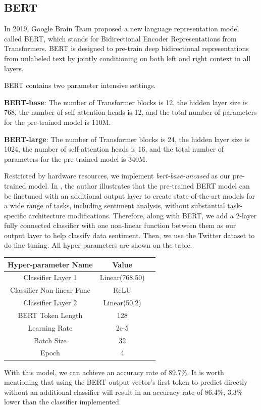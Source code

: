 \documentclass[journal]{IEEEtran}
\begin{document}
\subsection{BERT}
In 2019, Google Brain Team proposed a new language representation model called BERT, which stands for Bidirectional Encoder Representations from Transformers.\cite{bert} BERT is designed to pre-train deep bidirectional representations from
unlabeled text by jointly conditioning on both
left and right context in all layers. 

BERT contains two parameter intensive settings.

\textbf{BERT-base}: The number of Transformer blocks is 12, the hidden layer size is 768, the number of self-attention heads is 12, and the total number of parameters for the pre-trained model is 110M.

\textbf{BERT-large}: The number of Transformer blocks is 24, the hidden layer size is 1024, the number of self-attention heads is 16, and the total number of parameters for the pre-trained model is 340M.

Restricted by hardware resources, we implement \textit{bert-base-uncased} as our pre-trained model. In \cite{bert}, the author illustrates that the pre-trained BERT model can be finetuned with an additional output layer
to create state-of-the-art models for a wide range of tasks, including sentiment analysis, without substantial task-specific architecture modifications. Therefore, along with BERT, we add a 2-layer fully connected classifier with one non-linear function between them as our output layer to help classify data sentiment. Then, we use the Twitter dataset to do fine-tuning. All hyper-parameters are shown on the table.
\bigskip
\begin{center}
\begin{tabular}{ccc}
\hline
Hyper-parameter Name& Value\\
\hline
Classifier Layer 1& Linear(768,50) \\
Classifier Non-linear Func& ReLU \\
Classifier Layer 2& Linear(50,2) \\
BERT Token Length&  128\\
Learning Rate&  2e-5\\
Batch Size&  32\\
Epoch&  4\\
\hline
\end{tabular}
\end{center}
With this model, we can achieve an accuracy rate of 89.7\%. It is worth mentioning that using the BERT output vector's first token to predict directly without an additional classifier will result in an accuracy rate of 86.4\%, 3.3\% lower than the classifier implemented.
\end{document}
